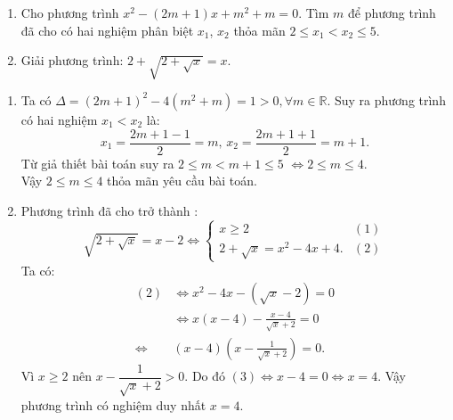 \begin{ex}%
\hfill
    \begin{enumerate}
        \item 	Cho phương trình 
        $x^2 - \left( 2m + 1 \right)x + m^2 + m = 0$.
        Tìm $m$ để phương trình đã cho có hai nghiệm phân biệt
        $x_1$, $x_2$ thỏa mãn 
        $2 \le x_1 < x_2 \le 5.$
        \item Giải  phương trình: $2 + \sqrt {2 + \sqrt x }  = x$.
    \end{enumerate}
\loigiai
    {
    \begin{enumerate}
        \item Ta có $\Delta  = \left( 2m + 1 \right)^2 - 4\left( m^2 + m \right) = 1 > 0,\forall m \in \mathbb{R}$.  
        Suy ra phương trình có hai nghiệm $x_1<x_2$ là:
        $$x_1 = \dfrac{2m + 1 - 1}{2} = m,\, x_2 = \frac{2m + 1 + 1}{2} = m + 1.$$ 
        Từ giả thiết bài toán suy ra $2 \le m < m + 1 \le 5$ $ \Leftrightarrow 2 \le m \le 4$.\\
        Vậy $2 \le m \le 4$ thỏa mãn yêu cầu bài toán.
        \item Phương trình đã cho trở thành :
        \[\sqrt {2 + \sqrt x }  = x - 2 \Leftrightarrow \left\{ \begin{array}{ll}
        x \ge 2&(1)\\
        2 + \sqrt x  = x^2 - 4x + 4.&(2)
        \end{array} \right.\]
        Ta có:
        {\allowdisplaybreaks
        	\begin{align*}
        	(2)&\Leftrightarrow x^2 - 4x - \left( \sqrt x  - 2 \right) = 0\\
        	&\Leftrightarrow x(x - 4) - \frac{x - 4}{\sqrt x  + 2} = 0\\
        	\Leftrightarrow& (x - 4)\left( x - \frac{1}{\sqrt x  + 2} \right) =0.\tag{3}
        	\end{align*}}Vì $x \ge 2$ nên $ x - \dfrac{1}{\sqrt x  + 2} > 0$. 
        Do đó $(3) \Leftrightarrow x - 4 = 0 \Leftrightarrow x = 4$.
        Vậy phương trình có nghiệm duy nhất $x = 4$.
    \end{enumerate}
    }
\end{ex}
